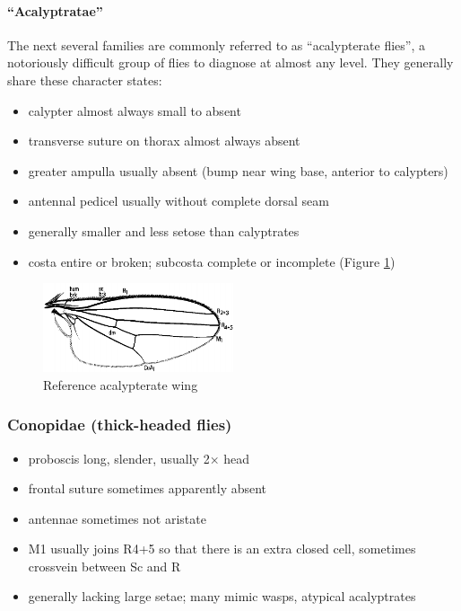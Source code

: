 \documentclass[letterpaper, 11pt]{article}
\begin{document}
\paragraph{``Acalyptratae''} The next several families are commonly referred to as ``acalypterate flies'', a notoriously difficult group of flies to diagnose at almost any level. They generally share these character states:
\begin{itemize}
\item calypter almost always small to absent
\item transverse suture on thorax almost always absent
\item greater ampulla usually absent (bump near wing base, anterior to calypters)
\item antennal pedicel usually without complete dorsal seam
\item generally smaller and less setose than calyptrates
\item costa entire or broken; subcosta complete or incomplete (Figure \ref{fig:acalypteratewing})
\end{itemize}

\begin{figure}[ht!]
  \centering
    \includegraphics[width=0.5\textwidth]{AcalyptrateWing}
  \caption{Reference acalypterate wing \citep[][Fig. 4.59]{mcalpine1981manual}}
  \label{fig:acalypteratewing}
\end{figure}

\subsubsection{Conopidae (thick-headed flies)}
\begin{itemize}
\item proboscis long, slender, usually 2× head
\item frontal suture sometimes apparently absent
\item antennae sometimes not aristate
\item M1 usually joins R4+5 so that there is an extra closed cell, sometimes crossvein between Sc and R
\item generally lacking large setae; many mimic wasps, atypical acalyptrates
\end{itemize}
\end{document}
